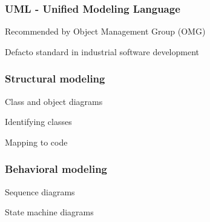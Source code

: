 \documentclass[10pt]{article}
\begin{document}
\subsubsection{UML - Unified Modeling Language}
\enumstart
	\item Recommended by Object Management Group (OMG)
	\item Defacto standard in industrial software development
\enumend

\subsubsection{Structural modeling}
\enumstart
	\item Class and object diagrams
	\item Identifying classes
	\item Mapping to code
\enumend

\subsubsection{Behavioral modeling}
\enumstart
	\item Sequence diagrams
	\item State machine diagrams
\enumend
\end{document}
